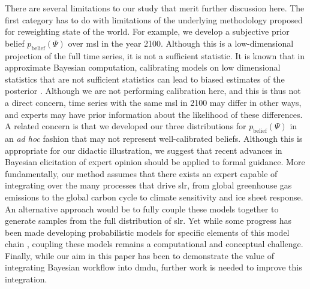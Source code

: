 \documentclass[11pt]{article}
\makeatletter
\newcommand{\klaus}[1]{\todo[color=rosso, textcolor=grigio]{\textbf{ATTN Klaus:~}#1}}
\DeclareRobustCommand\onedot{\futurelet\@let@token\@onedot}
\def\@onedot{\ifx\@let@token.\else.\null\fi\xspace}
\def\eg{\emph{e.g}\onedot} \def\Eg{\emph{E.g}\onedot}
\DeclareRobustCommand\onedot{\futurelet\@let@token\@onedot}
\def\@onedot{\ifx\@let@token.\else.\null\fi\xspace}
\def\eg{\emph{e.g}\onedot} \def\Eg{\emph{E.g}\onedot}
\makeatother
\begin{document}
There are several limitations to our study that merit further discussion here.
The first category has to do with limitations of the underlying methodology proposed for reweighting state of the world.
For example, we develop a subjective prior belief $p_\mathrm{belief}(\Psi)$ over \gls{msl} in the year 2100.
Although this is a low-dimensional projection of the full time series, it is not a sufficient statistic.
It is known that in approximate Bayesian computation, calibrating models on low dimensional statistics that are not sufficient statistics can lead to biased estimates of the posterior \citep{csillery_abc:2010,marjoram_abc:2006}.
Although we are not performing calibration here, and this is thus not a direct concern, time series with the same \gls{msl} in 2100 may differ in other ways, and experts may have prior information about the likelihood of these differences.
A related concern is that we developed our three distributions for $p_\mathrm{belief}(\Psi)$  in an \emph{ad hoc} fashion that may not represent well-calibrated beliefs.
Although this is appropriate for our didactic illustration, we suggest that recent advances in Bayesian elicitation of expert opinion \citep[see][and references therein]{mikkola_elicitation:2021} should be applied to formal guidance.
More fundamentally, our method assumes that there exists an expert capable of integrating over the many processes that drive \gls{slr}, from global greenhouse gas emissions to the global carbon cycle to climate sensitivity and ice sheet response.
An alternative approach would be to fully couple these models together to generate samples from the full distribution of \gls{slr}.
Yet while some progress has been made developing probabilistic models for specific elements of this model chain \citep[\eg,][]{srikrishnan_probabilistic:2022}, coupling these models remains a computational and conceptual challenge.\klaus{Is this too vague?}
Finally, while our aim in this paper has been to demonstrate the value of integrating Bayesian workflow \citep{gelman_workflow:2020} into \gls{dmdu}, further work is needed to improve this integration.
\end{document}
